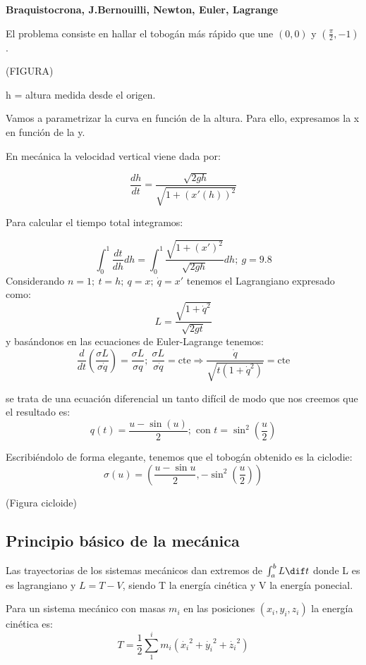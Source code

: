 \begin{example}
\textbf{Braquistocrona, J.Bernouilli, Newton, Euler, Lagrange}

El problema consiste en hallar el tobogán más rápido que une $(0,0)$ y $(\frac{\pi}{2},-1)$.

(FIGURA)

h = altura medida desde el origen.

Vamos a parametrizar la curva en función de la altura. Para ello, expresamos la x en función de la y.

En mecánica la velocidad vertical viene dada por:

$$\frac{dh}{dt} = \frac{\sqrt{2gh}}{\sqrt{1+(x'(h))^2}}$$

Para calcular el tiempo total integramos:

$$\int_0^1 \frac{dt}{dh} dh = \int_0^1 \frac{\sqrt{1 + (x')^2}}{\sqrt{2gh}} dh; \  g = 9.8$$
Considerando $n=1; \  t=h; \  q=x; \   \dot{q}=x'$ tenemos el Lagrangiano expresado como:
$$L = \frac{\sqrt{1+\dot{q}^2}}{\sqrt{2gt}} $$
y basándonos en las ecuaciones de Euler-Lagrange tenemos:
$$\frac{d}{dt} \left(\frac{\sigma L}{\sigma \dot{q}}\right) = \frac{\sigma L}{\sigma q}; \  \frac{\sigma L}{\sigma \dot{q}} = \text{cte} \Rightarrow \frac{\dot{q}}{\sqrt{t(1+\dot{q}^2)}} = \text{cte} $$

se trata de una ecuación diferencial un tanto difícil de modo que nos creemos que el resultado es:
$$ q(t) = \frac{u - \sin(u)}{2}; \text{ con } t=\sin^2\left(\frac{u}{2}\right) $$

Escribiéndolo de forma elegante, tenemos que el tobogán obtenido es la ciclodie:
$$ \sigma (u) = \left( \frac{u - \sin{u}}{2}, -\sin^2\left(\frac{u}{2}\right) \right) $$

(Figura cicloide)




\end{example}


\subsection{Principio básico de la mecánica}
\begin{theorem}
	Las trayectorias de los sistemas mecánicos dan extremos de $\int_a^b L \dif t$ donde L es es lagrangiano y $L= T-V$, siendo T la energía cinética y V la energía ponecial.
\end{theorem}
\begin{defn}
	Para un sistema mecánico con masas $m_i$ en las posiciones $(x_i,y_i,z_i)$ la energía cinética es:$$T = \frac{1}{2} \sum_{1}^{i} m_i(\dot{x_i}^2 + \dot{y_i}^2 + \dot{z_i}^2)$$
\end{defn}


